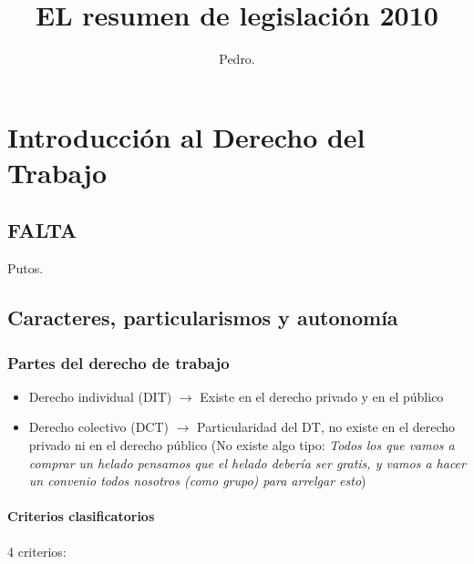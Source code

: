 \documentclass[spanish,12pt,a4paper,titlepage]{report}
\begin{document}
\title{\textbf{EL} resumen de legislación 2010}
\author{Pedro.}
\maketitle

\tableofcontents

\part{Introducción al Derecho del Trabajo}

\chapter{FALTA}
Putos.

\chapter{Caracteres, particularismos y autonomía}

\section{Partes del derecho de trabajo}
\label{sec:partes-del-derecho-de-trabajo}

\begin{itemize}
\item Derecho individual (DIT) $\rightarrow$ Existe en el derecho privado y en el público
\item Derecho colectivo (DCT) $\rightarrow$ Particularidad del DT, no existe en el derecho privado ni en el derecho público (No existe algo tipo: \textit{Todos los que vamos a comprar un helado pensamos que el helado debería ser gratis, y vamos a hacer un convenio todos nosotros (como grupo) para arrelgar esto})
\end{itemize}

\subsection{Criterios clasificatorios}
\label{sec:criterios-clasificatorios}

4 criterios:
\end{document}
